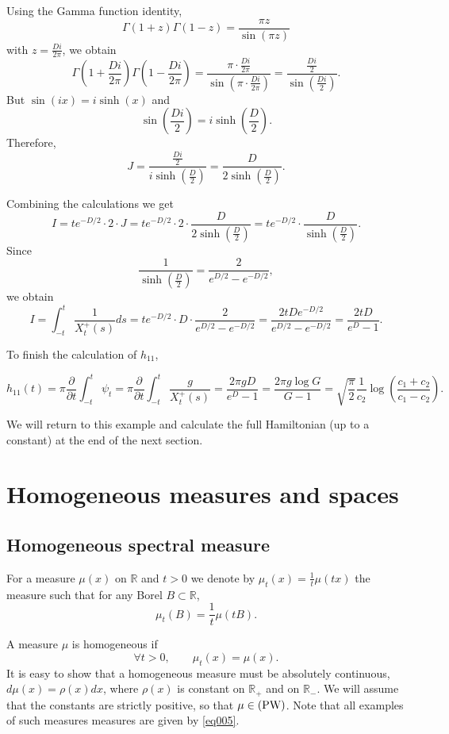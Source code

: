 \documentclass[11pt,twoside,reqno]{amsart}
\def\PW{\text{\rm PW}}
\def\ms{\bigskip}
\def\ms{\medskip}
\def\R{{\mathbb R}}
\theoremstyle{plain}
\numberwithin{equation}{section}
\begin{document}
Using the Gamma function identity,
\[
\Gamma(1 + z) \Gamma(1 - z) = \frac{\pi z}{\sin(\pi z)}
\]
with \( z = \frac{D i}{2\pi} \), we obtain
\[
\Gamma\left(1 + \frac{D i}{2\pi}\right) \Gamma\left(1 - \frac{D i}{2\pi}\right) = \frac{\pi \cdot \frac{D i}{2\pi}}{\sin\left( \pi \cdot \frac{D i}{2\pi} \right)} = \frac{\frac{D i}{2}}{\sin\left( \frac{D i}{2} \right)}.
\]
But \( \sin(i x) = i \sinh(x) \) and
\[
\sin\left( \frac{D i}{2} \right) = i \sinh\left( \frac{D}{2} \right).
\]
Therefore,
\[
J = \frac{\frac{D i}{2}}{i \sinh\left( \frac{D}{2} \right)} = \frac{D}{2 \sinh\left( \frac{D}{2} \right)}.
\]

Combining the calculations we get
\[
I = t e^{-D/2} \cdot 2 \cdot J = t e^{-D/2} \cdot 2 \cdot \frac{D}{2 \sinh\left( \frac{D}{2} \right)} = t e^{-D/2} \cdot \frac{D}{\sinh\left( \frac{D}{2} \right)}.
\]
Since
\[
\frac{1}{\sinh\left( \frac{D}{2} \right)} = \frac{2}{e^{D/2} - e^{-D/2}},
\]
we obtain
\[
I =\int_{-t}^{t} \frac{1}{X^+_t(s)}  ds = t e^{-D/2} \cdot D \cdot \frac{2}{e^{D/2} - e^{-D/2}} = \frac{2 t D e^{-D/2}}{e^{D/2} - e^{-D/2}} = \frac{2 t D}{e^{D} - 1}.
\]





To finish the calculation of $h_{11}$,
 
 $$h_{11}(t)=\pi \frac{\partial}{\partial t} \int_{-t}^t \psi_t=\pi \frac{\partial}{\partial t}\int_{-t}^{t} \frac{g}{X^+_t(s)} =\frac {2\pi gD}{e^D-1}=\frac{2\pi g\log G}{G-1}=\sqrt{\frac\pi 2}\frac 1{c_2}\log\left(\frac{c_1+c_2}{c_1-c_2}\right).$$
 

We will return to this example and calculate the full Hamiltonian (up to a constant) at the end of the next section.



\section{Homogeneous measures and spaces} \label{Hom}
\ms \subsection{Homogeneous spectral measure}  
For a measure $\mu(x)$ on $\R$ and $t>0$ we denote by $\mu_t(x)=\frac 1t\mu(tx)$ the measure such that for any Borel $B\subset \R$,
$$\mu_t(B)=\frac 1t\mu(tB).$$


A measure $\mu$ is homogeneous if 
$$\forall t>0,\qquad \mu_t(x)=\mu(x).$$
It is easy to show that a homogeneous measure must be absolutely continuous, $d\mu(x)=\rho(x)dx$,  where
$\rho(x)$  is constant on  $\R_+$ and on $\R_-$. We will assume that  the constants are strictly positive, so that   $\mu\in(\PW)$.
Note that all examples of such measures measures are given 
by \eqref{eq005}.
\end{document}

